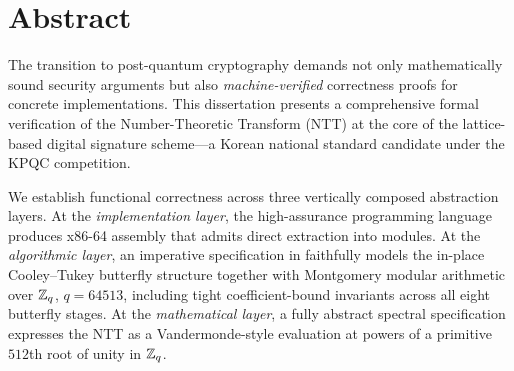 
\chapter*{Abstract}

\noindent
The transition to post-quantum cryptography demands not only mathematically
sound security arguments but also \emph{machine-verified} correctness proofs for
concrete implementations.  This dissertation presents a comprehensive formal
verification of the Number-Theoretic Transform (NTT) at the core of the
\haetae{} lattice-based digital signature scheme---a Korean national standard
candidate under the KPQC competition.

\medskip
\noindent
We establish functional correctness across three vertically composed
abstraction layers.  At the \emph{implementation layer}, the high-assurance
\jasmin{} programming language produces x86-64 assembly that admits direct
extraction into \easycrypt{} modules.  At the \emph{algorithmic layer}, an
imperative specification in \easycrypt{} faithfully models the in-place
Cooley--Tukey butterfly structure together with Montgomery modular arithmetic
over $\mathbb{Z}_q$, $q = 64513$, including tight coefficient-bound invariants across
all eight butterfly stages.  At the \emph{mathematical layer}, a fully abstract
spectral specification expresses the NTT as a Vandermonde-style evaluation at
powers of a primitive $512$th root of unity in $\mathbb{Z}_q$.

